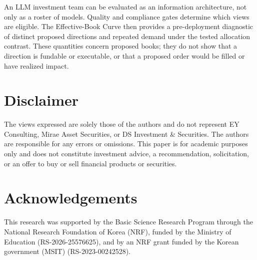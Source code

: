 \documentclass[sigconf]{acmart}
\providecommand{\ReviewBibliography}{refs}
\begin{document}
An LLM investment team can be evaluated as an information architecture, not only as a roster of models. Quality and compliance gates determine which views are eligible. The Effective-Book Curve then provides a pre-deployment diagnostic of distinct proposed directions and repeated demand under the tested allocation contrast. These quantities concern proposed books; they do not show that a direction is fundable or executable, or that a proposed order would be filled or have realized impact.

\section*{Disclaimer}
The views expressed are solely those of the authors and do not represent EY Consulting, Mirae Asset Securities, or DS Investment \& Securities. The authors are responsible for any errors or omissions. This paper is for academic purposes only and does not constitute investment advice, a recommendation, solicitation, or an offer to buy or sell financial products or securities.

\section*{Acknowledgements}
This research was supported by the Basic Science Research Program through the National Research
Foundation of Korea (NRF), funded by the Ministry of Education (RS-2026-25576625), and by an NRF
grant funded by the Korean government (MSIT) (RS-2023-00242528).



\end{document}
